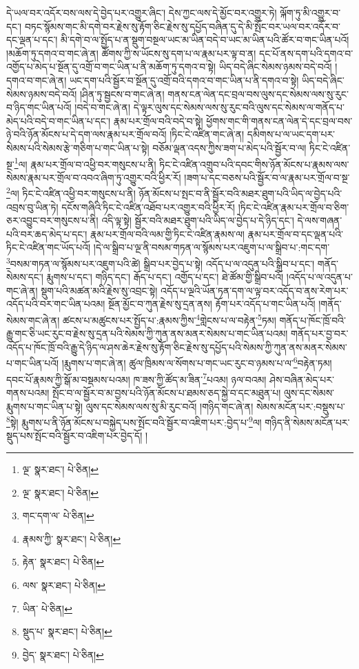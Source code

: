 དེ་ཡལ་བར་འདོར་བས་ལས་དེ་བྱེད་པར་འགྱུར་ཞིང་། དེས་ཀྱང་ལས་དེ་མྱོང་བར་འགྱུར་ཏེ། ལྐོག་ཏུ་མི་འགྱུར་བ་དང་། བཏང་སྙོམས་གང་མི་དགེ་བར་རྗེས་སུ་རྟོག་ཅིང་རྗེས་སུ་དཔྱོད་བཞིན་དུ་དེ་མི་སྤོང་བར་ཡལ་བར་འདོར་བ་དང་ལྡན་པ་དང་། མི་དགེ་བ་ལ་སྤྱོད་པ་ན་སྡུག་བསྔལ་ཡང་མ་ཡིན་བདེ་བ་ཡང་མ་ཡིན་པའི་ཚོར་བ་གང་ཡིན་པའོ། །མཆོག་ཏུ་དགའ་བ་གང་ཞེ་ན། ཚོགས་ཀྱི་ས་ཡོངས་སུ་དག་པ་ལ་རྣམ་པར་ལྟ་བ་ན། དང་པོ་ནས་དག་པའི་དགའ་བ་འགྱོད་པ་མེད་པ་སྔོན་དུ་འགྲོ་བ་གང་ཡིན་པ་ནི་མཆོག་ཏུ་དགའ་བ་སྟེ། ཡིད་བདེ་ཞིང་སེམས་ཉམས་བདེ་བའོ། །དགའ་བ་གང་ཞེ་ན། ཡང་དག་པའི་སྦྱོར་བ་སྔོན་དུ་འགྲོ་བའི་དགའ་བ་གང་ཡིན་པ་ནི་དགའ་བ་སྟེ། ཡིད་བདེ་ཞིང་སེམས་ཉམས་བདེ་བའོ། །ཤིན་ཏུ་སྦྱངས་བ་གང་ཞེ་ན། གནས་ངན་ལེན་དང་བྲལ་བས་ལུས་དང་སེམས་ལས་སུ་རུང་བ་ཉིད་གང་ཡིན་པའོ། །བདེ་བ་གང་ཞེ་ན། དེ་ལྟར་ལུས་དང་སེམས་ལས་སུ་རུང་བའི་ལུས་དང་སེམས་ལ་གནོད་པ་མེད་པའི་བདེ་བ་གང་ཡིན་པ་དང་། རྣམ་པར་གྲོལ་བའི་བདེ་བ་སྟེ། ཕྱོགས་གང་གི་གནས་ངན་ལེན་དེ་དང་བྲལ་བས་ཉེ་བའི་ཉོན་མོངས་པ་དེ་དག་ལས་རྣམ་པར་གྲོལ་བའོ། །ཏིང་ངེ་འཛིན་གང་ཞེ་ན། དམིགས་པ་ལ་ཡང་དག་པར་སེམས་པའི་སེམས་རྩེ་གཅིག་པ་གང་ཡིན་པ་སྟེ། བཅོམ་ལྡན་འདས་ཀྱིས་ཟག་པ་མེད་པའི་སྦྱོར་བ་ལ། ཏིང་ངེ་འཛིན་སྔ་\footnote{ལྔ་  སྣར་ཐང་།  པེ་ཅིན། }ལ། རྣམ་པར་གྲོལ་བ་འཕྱི་བར་གསུངས་པ་ནི། ཏིང་ངེ་འཛིན་འགྲུབ་པའི་དབང་གིས་ཉོན་མོངས་པ་རྣམས་ལས་སེམས་རྣམ་པར་གྲོལ་བ་འབའ་ཞིག་ཏུ་འགྱུར་བའི་ཕྱིར་རོ། །ཟག་པ་དང་བཅས་པའི་སྦྱོར་བ་ལ་རྣམ་པར་གྲོལ་བ་སྔ་\footnote{ལྔ་  སྣར་ཐང་།  པེ་ཅིན། }ལ། ཏིང་ངེ་འཛིན་འཕྱི་བར་གསུངས་པ་ནི། ཉོན་མོངས་པ་སྤང་བ་ནི་སྦྱོར་བའི་མཐར་ཐུག་པའི་ཡིད་ལ་བྱེད་པའི་འབྲས་བུ་ཡིན་ཏེ། དངོས་གཞིའི་ཏིང་ངེ་འཛིན་འཐོབ་པར་འགྱུར་བའི་ཕྱིར་རོ། །ཏིང་ངེ་འཛིན་རྣམ་པར་གྲོལ་བ་ཅིག་ཅར་འབྱུང་བར་གསུངས་པ་ནི། འདི་ལྟ་སྟེ། སྦྱོར་བའི་མཐར་ཐུག་པའི་ཡིད་ལ་བྱེད་པ་དེ་ཉིད་དང་། དེ་ལས་གཞན་པའི་བར་ཆད་མེད་པ་དང་། རྣམ་པར་གྲོལ་བའི་ལམ་གྱི་ཏིང་ངེ་འཛིན་རྣམས་ལ། རྣམ་པར་གྲོལ་བ་དང་ལྡན་པའི་ཏིང་ངེ་འཛིན་གང་ཡོད་པའོ། །དེ་ལ་སྒྲིབ་པ་ལྔ་ནི་བསམ་གཏན་ལ་སྙོམས་པར་འཇུག་པ་ལ་སྒྲིབ་པ་:གང་དག་\footnote{གང་དག་ལ་  པེ་ཅིན། }བསམ་གཏན་ལ་སྙོམས་པར་འཇུག་པའི་ཚེ། སྒྲིབ་པར་བྱེད་པ་སྟེ། འདོད་པ་ལ་འདུན་པའི་སྒྲིབ་པ་དང་། གནོད་སེམས་དང་། རྨུགས་པ་དང་། གཉིད་དང་། རྒོད་པ་དང་། འགྱོད་པ་དང་། ཐེ་ཚོམ་གྱི་སྒྲིབ་པའོ། །འདོད་པ་ལ་འདུན་པ་གང་ཞེ་ན། སྡུག་པའི་མཚན་མའི་རྗེས་སུ་འབྲང་སྟེ། འདོད་པ་ལྔའི་ཡོན་ཏན་དག་ལ་ལྟ་བར་འདོད་བ་ནས་རེག་པར་འདོད་པའི་བར་གང་ཡིན་པའམ། སྔོན་མྱོང་བ་ཀུན་རྗེས་སུ་དྲན་ནས། རྟོག་པར་འདོད་པ་གང་ཡིན་པའོ། །གནོད་སེམས་གང་ཞེ་ན། ཚངས་པ་མཚུངས་པར་སྤྱོད་པ་:རྣམས་ཀྱིས་\footnote{རྣམས་ཀྱི་  སྣར་ཐང་།  པེ་ཅིན། }གླེངས་པ་ལ་བརྟེན་\footnote{རྟེན་  སྣར་ཐང་།  པེ་ཅིན། }ཏམ། གནོད་པ་ཁོང་ཁྲོ་བའི་རྒྱུ་གང་ཅི་ཡང་རུང་བ་རྗེས་སུ་དྲན་པའི་སེམས་ཀྱི་ཀུན་ནས་མནར་སེམས་པ་གང་ཡིན་པའམ། གནོད་པར་བྱ་བར་འདོད་པ་ཁོང་ཁྲོ་བའི་རྒྱུ་དེ་ཉིད་ལ་ཤས་ཆེར་རྗེས་སུ་རྟོག་ཅིང་རྗེས་སུ་དཔྱོད་པའི་སེམས་ཀྱི་ཀུན་ནས་མནར་སེམས་པ་གང་ཡིན་པའོ། །རྨུགས་པ་གང་ཞེ་ན། ཚུལ་ཁྲིམས་ལ་སོགས་པ་གང་ཡང་རུང་བ་ཉམས་པ་ལ་\footnote{ལས་  སྣར་ཐང་།  པེ་ཅིན། }བརྟེན་ཏམ། དབང་པོ་རྣམས་ཀྱི་སྒོ་མ་བསྡམས་པའམ། ཁ་ཟས་ཀྱི་ཚོད་མ་ཟིན་\footnote{ཡིན་  པེ་ཅིན། }པའམ། ཉལ་བའམ། ཤེས་བཞིན་མེད་པར་གནས་པའམ། སྤོང་བ་ལ་སྦྱོར་བ་མ་བྱས་པའི་ཉོན་མོངས་པ་ཐམས་ཅད་སྐྱེ་བ་དང་མཐུན་པ། ལུས་དང་སེམས་རྨུགས་པ་གང་ཡིན་པ་སྟེ། ལུས་དང་སེམས་ལས་སུ་མི་རུང་བའོ། །གཉིད་གང་ཞེ་ན། སེམས་མངོན་པར་:བསྡུས་པ་\footnote{སྡུད་པ་  སྣར་ཐང་།  པེ་ཅིན། }སྟེ། རྨུགས་པ་ནི་ཉོན་མོངས་པ་བསྐྱེད་པས་སྤོང་བའི་སྦྱོར་བ་འཇིག་པར་:བྱེད་པ་\footnote{བྱེད་  སྣར་ཐང་།  པེ་ཅིན། }ལ། གཉིད་ནི་སེམས་མངོན་པར་སྡུད་པས་སྤོང་བའི་སྦྱོར་བ་འཇིག་པར་བྱེད་དོ། །
